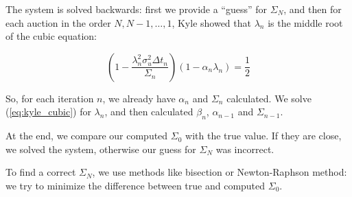 \documentclass{beamer}
\begin{document}
\begin{frame}
The system is solved backwards: first we provide a ``guess'' for $\Sigma_N$, and then for each auction in the order $N, N - 1, \ldots, 1$, Kyle showed that $\lambda_n$ is the middle root of the cubic equation:

\begin{equation}\label{eq:kyle_cubic}
    \left(1 - \dfrac{\lambda_n^2\sigma_u^2\Delta t_n}{\Sigma_n}\right)(1 - \alpha_n\lambda_n) = \dfrac{1}{2}
\end{equation}

So, for each iteration $n$, we already have $\alpha_n$ and $\Sigma_n$ calculated. We solve (\ref{eq:kyle_cubic}) for $\lambda_n$, and then calculated $\beta_n$, $\alpha_{n-1}$ and $\Sigma_{n-1}$. 

At the end, we compare our computed $\Sigma_0$ with the true value. If they are close, we solved the system, otherwise our guess for $\Sigma_N$ was incorrect. 

To find a correct $\Sigma_N$, we use methods like bisection or Newton-Raphson method: we try to minimize the difference between true and computed $\Sigma_0$.

\end{frame}
\end{document}
